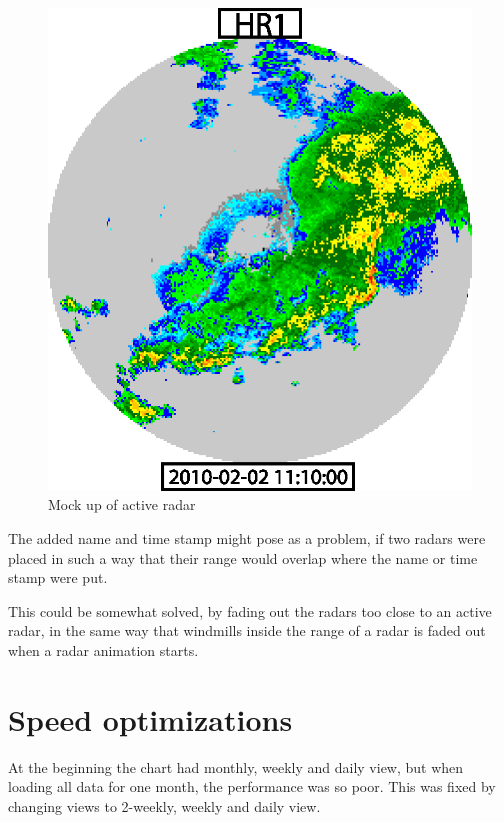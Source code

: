 \begin{figure}[htbp]
\begin{minipage}[b]{0.5\linewidth}
    \includegraphics[width=\linewidth]{figure/radar2.eps}
    \caption{Mock up of active radar}
    \label{fig:mock_up_active_radar}
  \end{minipage}
\end{figure}
The added name and time stamp might pose as a problem, if two radars were placed in such a way that their range would overlap where the name or time stamp were put.

This could be somewhat solved, by fading out the radars too close to an active radar, in the same way that windmills inside the range of a radar is faded out when a radar animation starts.

\section{Speed optimizations}
At the beginning the chart had monthly, weekly and daily view, but when loading all data for one month, the performance was so poor. This was fixed by changing views to 2-weekly, weekly and daily view.

